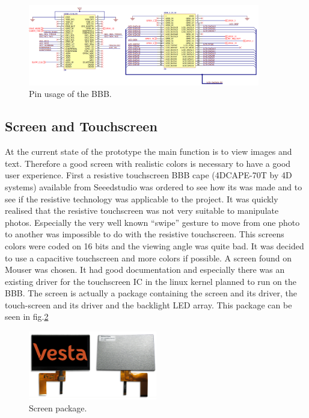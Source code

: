 \begin{figure}
    \centering
    \includegraphics[width=0.9\textwidth,keepaspectratio]{chap/hardFig/BBB_pins_sch}
    \caption{Pin usage of the BBB.}
    \label{fig:pin modes}
\end{figure}

\clearpage



\subsection{Screen and Touchscreen}
At the current state of the prototype the main function is to view images and text. Therefore a good screen with realistic colors is necessary to have a good user experience.
First a resistive touchscreen BBB cape (4DCAPE-70T by 4D systems) available from Seeedstudio was ordered to see how its was made and to see if the resistive technology was applicable to the project. It was quickly realised that the resistive touchscreen was not very suitable to manipulate photos. Especially the very well known “swipe” gesture to move from one photo to another was impossible to do with the resistive touchscreen.
This screens colors were coded on 16 bits and the viewing angle was quite bad. It was decided to use a capacitive touchscreen and more colors if possible. A screen found on Mouser was chosen. It had good documentation and especially there was an existing driver for the touchscreen IC in the linux kernel planned to run on the BBB.
 The screen is actually a package containing the screen and its driver, the touch-screen and its driver and the backlight LED array. This package can be seen in fig.\ref{fig:screen package}

 \begin{figure}[!htb]
     \centering
     \includegraphics[width=0.5\textwidth,keepaspectratio]{chap/hardFig/newhaven_screen_image}
     \caption{Screen package.}
     \label{fig:screen package}
 \end{figure}

